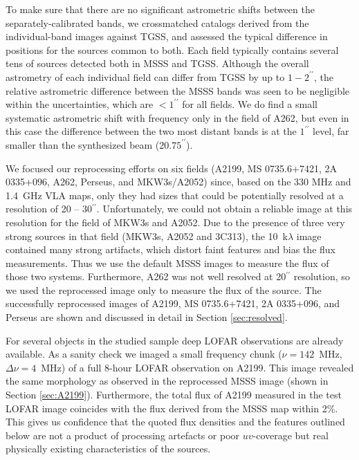 \documentclass{aa}  %
\begin{document}
To make sure that there are no significant astrometric shifts between the separately-calibrated bands, we crossmatched catalogs derived from the individual-band images against TGSS, and assessed the typical difference in positions for the sources common to both. 
Each field typically contains several tens of sources detected both in MSSS and TGSS. 
Although the overall astrometry of each individual field can differ from TGSS by up to $1-2^{\prime\prime}$, the relative astrometric difference between the MSSS bands was seen to be negligible within the uncertainties, which are $<1^{\prime\prime}$ for all fields. 
We do find a small systematic astrometric shift with frequency only in the field of A262, but even in this case the difference between the two most distant bands is at the $1^{\prime\prime}$ level, far smaller than the synthesized beam ($20.75^{\prime\prime}$).

We focused our reprocessing efforts on six fields (A2199, MS 0735.6+7421, 2A 0335+096, A262, Perseus, and MKW3s/A2052) since, based on the 330 MHz and 1.4~GHz VLA maps, only they had sizes that could be potentially resolved at a resolution of 20 -- 30$^{\prime\prime}$. 
Unfortunately, we could not obtain a reliable image at this resolution for the field of MKW3s and A2052. Due to the presence of three very strong sources in that field (MKW3s, A2052 and 3C313), the 10~k$\lambda$ image contained many strong artifacts, which distort faint features and bias the flux measurements. Thus we use the default MSSS images to measure the flux of those two systems.
Furthermore, A262 was not well resolved at 20$^{\prime\prime}$ resolution, so we used the reprocessed image only to measure the flux of the source.
The successfully reprocessed images of A2199, MS 0735.6+7421, 2A 0335+096, and Perseus are shown and discussed in detail in Section \ref{sec:resolved}.

For several objects in the studied sample deep LOFAR observations are already available. 
As a sanity check we imaged a small frequency chunk ($\nu=142$~MHz, $\Delta\nu=4$~MHz) of a full 8-hour LOFAR observation on A2199.
This image revealed the same morphology as observed in the reprocessed MSSS image (shown in Section \ref{sec:A2199}). 
Furthermore, the total flux of A2199 measured in the test LOFAR image coincides with the flux derived from the MSSS map within 2\%.
This gives us confidence that the quoted flux densities and the features outlined below are not a product of processing artefacts or poor $uv$-coverage but real physically existing characteristics of the sources. 
\end{document}
